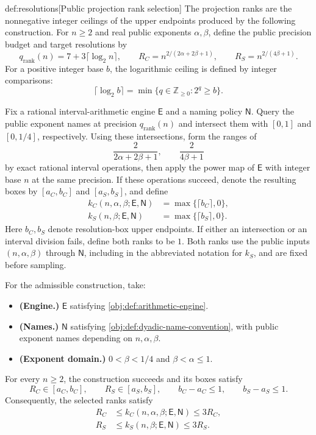 \documentclass[11pt]{article}
\begin{document}
\begin{algorithmv}{def:resolutions}[Public projection rank selection]
The projection ranks are the nonnegative integer ceilings of the upper endpoints produced by the following construction. For \(n\ge2\) and real public exponents \(\alpha,\beta\), define the public precision budget and target resolutions by
\[
q_{\mathrm{rank}}(n)=7+3\lceil\log_2 n\rceil,\qquad
R_C=n^{2/(2\alpha+2\beta+1)},\qquad
R_S=n^{2/(4\beta+1)}.
\]
For a positive integer base \(b\), the logarithmic ceiling is defined by integer comparisons:
\[
\lceil\log_2 b\rceil
=\min\{q\in\mathbb Z_{\ge0}:2^q\ge b\}.
\]

Fix a rational interval-arithmetic engine \(\mathsf E\) and a naming policy \(\mathsf N\). Query the public exponent names at precision \(q_{\mathrm{rank}}(n)\) and intersect them with \([0,1]\) and \([0,1/4]\), respectively. Using these intersections, form the ranges of
\[
\frac{2}{2\alpha+2\beta+1},
\qquad
\frac{2}{4\beta+1}
\]
by exact rational interval operations, then apply the power map of \(\mathsf E\) with integer base \(n\) at the same precision. If these operations succeed, denote the resulting boxes by \([a_C,b_C]\) and \([a_S,b_S]\), and define
\[
\begin{aligned}
k_C(n,\alpha,\beta;\mathsf E,\mathsf N)
&=\max\{\lceil b_C\rceil,0\},\\
k_S(n,\beta;\mathsf E,\mathsf N)
&=\max\{\lceil b_S\rceil,0\}.
\end{aligned}
\]
Here \(b_C,b_S\) denote resolution-box upper endpoints. If either an intersection or an interval division fails, define both ranks to be \(1\). Both ranks use the public inputs \((n,\alpha,\beta)\) through \(\mathsf N\), including in the abbreviated notation for \(k_S\), and are fixed before sampling.

For the admissible construction, take:
\begin{itemize}
\item \textbf{(Engine.)} \(\mathsf E\) satisfying \cref{obj:def:arithmetic-engine}.
\item \textbf{(Names.)} \(\mathsf N\) satisfying \cref{obj:def:dyadic-name-convention}, with public exponent names depending on \(n,\alpha,\beta\).
\item \textbf{(Exponent domain.)} \(0<\beta<1/4\) and \(\beta<\alpha\le1\).
\end{itemize}
For every \(n\ge2\), the construction succeeds and its boxes satisfy
\[
R_C\in[a_C,b_C],\qquad R_S\in[a_S,b_S],
\qquad b_C-a_C\le1,\qquad b_S-a_S\le1.
\]
Consequently, the selected ranks satisfy
\[
\begin{aligned}
R_C&\le k_C(n,\alpha,\beta;\mathsf E,\mathsf N)\le3R_C,\\
R_S&\le k_S(n,\beta;\mathsf E,\mathsf N)\le3R_S.
\end{aligned}
\]
\end{algorithmv}
\end{document}
